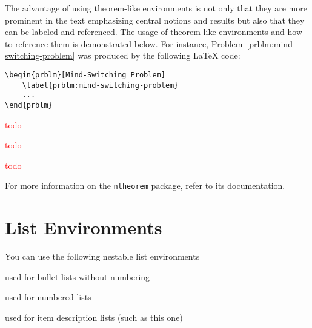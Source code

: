 The advantage of using theorem-like environments is not only that they are more prominent in the text emphasizing central notions and results but also that they can be labeled and referenced. The usage of theorem-like environments and how to reference them is demonstrated below. For instance, Problem~\ref{prblm:mind-switching-problem} was produced by the following \LaTeX{} code: 
\begin{Verbatim}
\begin{prblm}[Mind-Switching Problem] 
	\label{prblm:mind-switching-problem}
	...
\end{prblm} 
\end{Verbatim}

\begin{prblm} 
    \label{prblm:mind-switching-problem}
    \textcolor{red}{todo} %
\end{prblm} 

\begin{defn}
	\textcolor{red}{todo} %
\end{defn}

\begin{thm}
	\textcolor{red}{todo} %
\end{thm}

For more information on the \texttt{ntheorem} package, refer to its documentation. %

\section{List Environments} 

You can use the following nestable list environments 
\begin{description}[font=\normalfont\ttfamily]
	\item[itemize] used for bullet lists without numbering
	\item[enumerate] used for numbered lists 
	\item[description] used for item description lists (such as this one)
\end{description}

